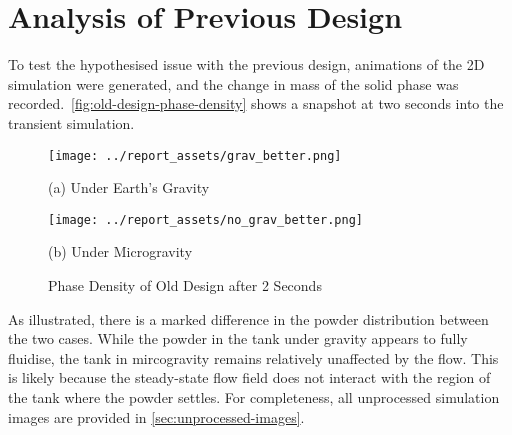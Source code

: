 \section{Analysis of Previous Design}\label{sec:prev-design-analysis}
To test the hypothesised issue with the previous design, animations of the 2D simulation were generated, and the change in mass of the solid phase was recorded.~\autoref{fig:old-design-phase-density} shows a snapshot at two seconds into the transient simulation. 
\begin{figure}[htbp]
    \centering
    
    \begin{minipage}{0.4\textwidth}
        \centering
        \texttt{[image: ../report\_assets/grav\_better.png]}
        \caption*{(a) Under Earth's Gravity}
    \end{minipage}
    \hfill
    \begin{minipage}{0.4\textwidth}
        \centering
        \texttt{[image: ../report\_assets/no\_grav\_better.png]}
        \caption*{(b) Under Microgravity}
    \end{minipage}
    \caption{Phase Density of Old Design after 2 Seconds}\label{fig:old-design-phase-density}
\end{figure}
As illustrated, there is a marked difference in the powder distribution between the two cases. While the powder in the tank under gravity appears to fully fluidise, the tank in mircogravity remains relatively unaffected by the flow. This is likely because the steady-state flow field does not interact with the region of the tank where the powder settles. For completeness, all unprocessed simulation images are provided in \autoref{sec:unprocessed-images}.

